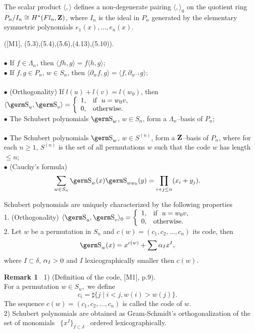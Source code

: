 {The scalar product $\langle ,\rangle$ defines a non-degenerate pairing
$\langle ,\rangle_0$ on the quotient ring $P_n/I_n\cong H^*(Fl_n,{\bf Z})$,
where $I_n$ is the ideal in $P_n$ generated by the elementary symmetric
polynomials $e_1(x),\ldots ,e_n(x)$.

\begin{pr} ([M1], (5.3),(5.4),(5.6),(4.13),(5.10)).\\ ~\\
$\bullet$ If $f\in\Lambda_n$, then $\langle fh,g\rangle =f\langle 
h,g\rangle $;\\ 
$\bullet$ If $f,g\in P_n$, $w\in S_n$, then 
$\langle\partial_wf,g\rangle =\langle f,\partial_{w^{-1}}g\rangle$;\\ ~\\
$\bullet$ (Orthogonality) If $l(u)+l(v)=l(w_0)$, then 
$\langle\s_u,\s_v\rangle =\left\{\begin{array}{ll}
                                        1, & \mbox{\rm if \ $u=w_0v$,}\\
                                        0, & \mbox{\rm otherwise}.
\end{array}\right.$\\
$\bullet$ The Schubert polynomials $\s_w$, $w\in S_n$, form a 
$\Lambda_n$--basis of $P_n$;\\ ~\\
$\bullet$ The Schubert polynomials $\s_w$, $w\in S^{(n)}$, form a ${\bf 
Z}$--basis of $P_n$, where for each $n\ge 1$, $S^{(n)}$ is the set of all 
permutations $w$ such that the code $w$ has length $\le n$;\\
$\bullet$ (Cauchy's formula)
$$\sum_{w\in S_n}\s_w(x)\s_{ww_0}(y)=\prod_{i+j\le n}(x_i+y_j).
$$
\end{pr}
\begin{pr} Schubert polynomials are uniquely characterized by the 
following properties\\
1. (Orthogonality) $\langle\s_u,\s_v\rangle_0 =\left\{\begin{array}{ll}
                                        1, & \mbox{\rm if \ $u=w_0v$,}\\
                                        0, & \mbox{\rm otherwise}.
\end{array}\right.$\\
2. Let $w$ be a permutation in $S_n$ and $c(w)=(c_1,c_2,\ldots ,c_n)$ its 
code, then
$$\s_w(x)=x^{c(w)}+\sum\al_Ix^I,
$$
where $I\subset\delta$, $\alpha_I>0$ and $I$ lexicographically smaller then 
$c(w)$.
\end{pr} 
{\bf Remark 1} \ 1) (Definition of the code, [M1], p.9). \\ 
For a permutation $w\in S_n,$ we define 
\[ c_i = \sharp \{ j \mid i<j, w(i)> w(j) \} . \] 
The sequence $c(w)=(c_1,c_2,\ldots ,c_n)$ is called the 
code of $w.$ \smallskip \\ 
2) Schubert polynomials are obtained as 
Gram-Schmidt's orthogonalization of the set of monomials 
~$\{ x^I\}_{I\subset \delta}$~ ordered lexicographically. 

}
